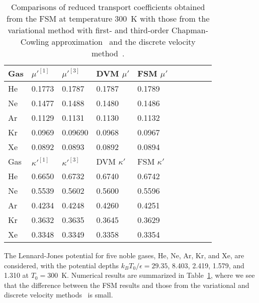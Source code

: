 \begin{table}[t]
	\caption{Comparisons of reduced transport coefficients obtained from the FSM at temperature 300~K with those from the variational method with first- and third-order Chapman-Cowling approximation~\cite{variational} and the discrete velocity method~\cite{Sharipov_trans}.   }
	\centering
	\begin{tabular}{p{1cm}p{3cm}p{3cm}p{2cm}p{2cm}ccccc}
		\hline
		Gas & $\mu'^{[1]}$ & $\mu'^{[3]}$ &    DVM $\mu'$ & FSM  $\mu'$\\ 
		\hline 
		He & 0.1773 & 0.1787 & 0.1787 & 0.1789 \\
		Ne & 0.1477 & 0.1488 & 0.1480 & 0.1486   \\
		Ar & 0.1129 & 0.1131 & 0.1130 & 0.1132  \\
		Kr & 0.0969 & 0.09690 & 0.0968 & 0.0967  \\
		Xe & 0.0892 & 0.0893 & 0.0892 & 0.0894 \\
		\hline
		Gas & $\kappa'^{[1]}$ & $\kappa'^{[3]}$ &    DVM $\kappa'$ & FSM  $\kappa'$\\ 
		He & 0.6650 & 0.6732 & 0.6740 & 0.6742 \\
		Ne & 0.5539 & 0.5602 & 0.5600 & 0.5596  \\
		Ar & 0.4234 & 0.4248 & 0.4260 & 0.4251  \\
		Kr & 0.3632 & 0.3635 & 0.3645 & 0.3629  \\
		Xe & 0.3348 & 0.3349 & 0.3358 & 0.3354  \\
		\hline
	\end{tabular}
	\label{transport_coe} 
\end{table}



The Lennard-Jones potential for five noble gases, He, Ne, Ar, Kr, and Xe, are considered, with the 
potential depths $k_BT_0/\epsilon=29.35$, 8.403, 2.419, 1.579, and 1.310 at $T_0=300$~K. Numerical results are summarized in Table~\ref{transport_coe}, where we see that the difference between the FSM results and those from the variational and discrete velocity methods~\cite{Sharipov_trans} is small. 


